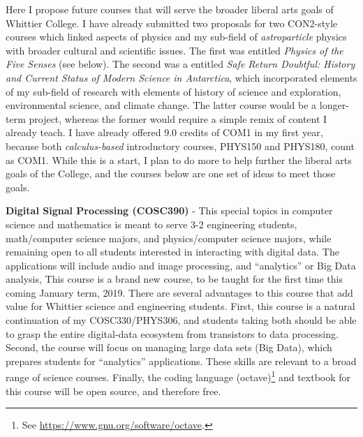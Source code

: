 \documentclass[../../main.tex]{subfiles}
\begin{document}
\label{sec:future}

Here I propose future courses that will serve the broader liberal arts goals of Whittier College.  I have already submitted two proposals for two CON2-style courses which linked aspects of physics and my sub-field of \textit{astroparticle} physics with broader cultural and scientific issues.  The first was entitled \textit{Physics of the Five Senses} (see below).  The second was a entitled \textit{Safe Return Doubtful: History and Current Status of Modern Science in Antarctica}, which incorporated elements of my sub-field of research with elements of history of science and exploration, environmental science, and climate change.  The latter course would be a longer-term project, whereas the former would require a simple remix of content I already teach.  I have already offered 9.0 credits of COM1 in my first year, because both \textit{calculus-based} introductory courses, PHYS150 and PHYS180, count as COM1.  While this is a start, I plan to do more to help further the liberal arts goals of the College, and the courses below are one set of ideas to meet those goals.  \\ \hspace{0.1cm}

\textbf{Digital Signal Processing (COSC390)} - This special topics in computer science and mathematics is meant to serve 3-2 engineering students, math/computer science majors, and physics/computer science majors, while remaining open to all students interested in interacting with digital data.  The applications will include audio and image processing, and ``analytics'' or Big Data analysis,  This course is a brand new course, to be taught for the first time this coming January term, 2019. There are several advantages to this course that add value for Whittier science and engineering students.  First, this course is a natural continuation of my COSC330/PHYS306, and students taking both should be able to grasp the entire digital-data ecosystem from transistors to data processing.  Second, the course will focus on managing large data sets (Big Data), which prepares students for ``analytics'' applications.  These skills are relevant to a broad range of science courses.  Finally, the coding language (octave)\footnote{See \url{https://www.gnu.org/software/octave}.} and textbook \cite{dsp} for this course will be open source, and therefore free. \\ \hspace{0.1cm}
\end{document}

